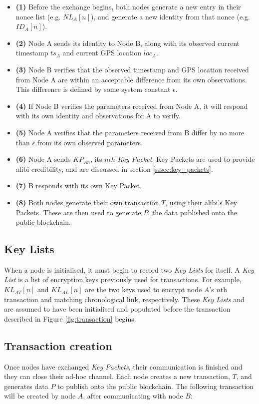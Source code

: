 \begin{itemize}
	\item[] \textbf{(1)} Before the exchange begins, both nodes generate a new entry in their nonce list (e.g. $NL_A[n]$), and generate a new identity from that nonce (e.g. $ID_A[n]$).
	\item[] \textbf{(2)} Node A sends its identity to Node B, along with its observed current timestamp $ts_A$ and current GPS location $loc_A$.
	\item[] \textbf{(3)} Node B verifies that the observed timestamp and GPS location received from Node A are within an acceptable difference from its own observations. This difference is defined by some system constant $\epsilon$.
	\item[] \textbf{(4)} If Node B verifies the parameters received from Node A, it will respond with its own identity and observations for A to verify.
	\item[] \textbf{(5)} Node A verifies that the parameters received from B differ by no more than $\epsilon$ from its own observed parameters.
	\item[] \textbf{(6)} Node A sends $KP_{An}$, its $nth$ \textit{Key Packet}. Key Packets are used to provide alibi credibility, and are discussed in section \ref{sssec:key_packets}.
	\item[] \textbf{(7)} B responds with its own Key Packet.
	\item[] \textbf{(8)} Both nodes generate their own transaction $T$, using their alibi's Key Packets. These are then used to generate $P$, the data published onto the public blockchain.
\end{itemize}

\subsection{Key Lists}
When a node is initialised, it must begin to record two \textit{Key Lists} for itself. A \textit{Key List} is a list of encryption keys previously used for transactions. For example, $KL_{AT}[n]$ and $KL_{AL}[n]$ are the two keys used to encrypt node $A$'s $n$th transaction and matching chronological link, respectively. These \textit{Key Lists} and are assumed to have been initialised and populated before the transaction described in Figure \ref{fig:transaction} begins.

\subsection{Transaction creation}
Once nodes have exchanged \textit{Key Packets}, their communication is finished and they can close their ad-hoc channel. Each node creates a new transaction, $T$, and generates data $P$ to publish onto the public blockchain. The following transaction will be created by node $A$, after communicating with node $B$:
\\

